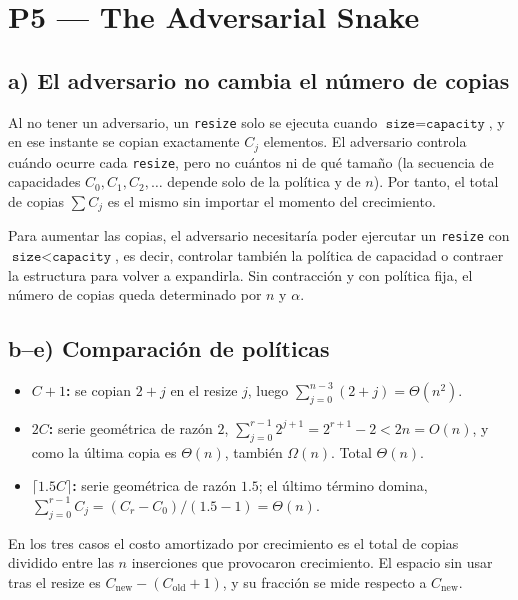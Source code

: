 \documentclass[11pt,a4paper]{article}
\begin{document}
\section*{P5 --- The Adversarial Snake}

\subsection*{a) El adversario no cambia el número de copias}

Al no tener un adversario, un \texttt{resize} solo se ejecuta cuando $\texttt{size} = \texttt{capacity}$, y en ese instante se copian exactamente $C_j$ elementos. El adversario controla cuándo ocurre cada \texttt{resize}, pero no cuántos ni de qué tamaño (la secuencia de capacidades $C_0, C_1, C_2, \dots$ depende solo de la política y de $n$). Por tanto, el total de copias $\sum C_j$ es el mismo sin importar el momento del crecimiento.

Para aumentar las copias, el adversario necesitaría poder ejercutar un \texttt{resize} con $\texttt{size} < \texttt{capacity}$, es decir, controlar también la política de capacidad o contraer la estructura para volver a expandirla. Sin contracción y con política fija, el número de copias queda determinado por $n$ y $\alpha$.

\subsection*{b--e) Comparación de políticas}

\begin{itemize}[leftmargin=1.2cm]
    \item \textbf{$C+1$:} se copian $2+j$ en el resize $j$, luego $\sum_{j=0}^{n-3}(2+j) = \Theta(n^2)$.
    \item \textbf{$2C$:} serie geométrica de razón $2$, $\sum_{j=0}^{r-1} 2^{j+1} = 2^{r+1}-2 < 2n = O(n)$, y como la última copia es $\Theta(n)$, también $\Omega(n)$. Total $\Theta(n)$.
    \item \textbf{$\lceil 1.5C\rceil$:} serie geométrica de razón $1.5$; el último término domina, $\sum_{j=0}^{r-1} C_j = (C_r - C_0)/(1.5-1) = \Theta(n)$.
\end{itemize}

En los tres casos el costo amortizado por crecimiento es el total de copias dividido entre las $n$ inserciones que provocaron crecimiento. El espacio sin usar tras el resize es $C_{\text{new}} - (C_{\text{old}}+1)$, y su fracción se mide respecto a $C_{\text{new}}$.
\end{document}
